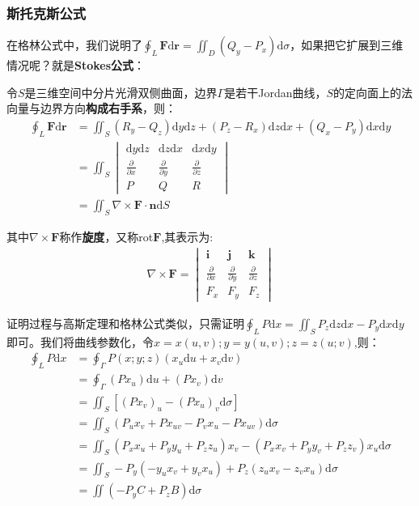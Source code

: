 \documentclass{ctexart}
\let\oldtextbf\textbf
\renewcommand{\textbf}[1]{\textcolor{brown!50!red}{\oldtextbf{#1}}}
\begin{document}
\subsubsection{斯托克斯公式}
在格林公式中，我们说明了$\oint_L \bm{F}\mathrm{d}\bm{r}=\iint_D(Q_y-P_x)\mathrm{d}\sigma$，如果把它扩展到三维情况呢？就是\textbf{\color{brown!50!red}Stokes公式}：
\begin{tcolorbox}[
    colback=bac1,     %
    colframe=fra1,   %
    coltitle=white,             %
    coltext=tex1,
    title=Stokes公式,
    fonttitle=\bfseries,        %
arc=3mm,                     %
breakable
]
令$S$是三维空间中分片光滑双侧曲面，边界$\Gamma$是若干Jordan曲线，$S$的定向面上的法向量与边界方向\textbf{\color{brown!50!red}构成右手系}，则：
\begin{align*} 
 \oint_L\bm{F}\mathrm{d}\bm{r}&=\iint_S(R_y-Q_z)\mathrm{d}y\mathrm{d}z+(P_z-R_x)\mathrm{d}z\mathrm
{d}x+(Q_x-P_y)\mathrm{d}x\mathrm{d}y \\
&=\iint_S\begin{vmatrix}
\mathrm{d}y\mathrm{d}z  & \mathrm{d}z\mathrm{d}x& \mathrm{d}x\mathrm{d}y\\
\frac{\partial}{\partial x}  & \frac{\partial}{\partial y} & \frac{\partial}{\partial z}\\
P  & Q & R
\end{vmatrix} \\ 
&=\iint_S \nabla\times\bm{F}\cdot \bm{n}\mathrm{d}S\tag{3-10}       
\end{align*}

其中$\nabla\times\bm{F}$称作\textbf{\color{brown!50!red}旋度}，又称rot$\bm{F}$,其表示为:
\begin{align*} 
 \nabla \times \mathbf{F} = \begin{vmatrix}
\mathbf{i} & \mathbf{j} & \mathbf{k} \\
\frac{\partial}{\partial x} & \frac{\partial}{\partial y} & \frac{\partial}{\partial z} \\
F_x & F_y & F_z
\end{vmatrix} \tag{3-11}       
\end{align*}
\end{tcolorbox}

证明过程与高斯定理和格林公式类似，只需证明$\oint_LP\mathrm{d}x=\iint_S P_z\mathrm{d}z\mathrm{d}x-P_y\mathrm{d}x\mathrm{d}y$即可。我们将曲线参数化，令$x=x(u,v);y=y(u,v);z=z(u;v)$,则：
\begin{align*} 
 \oint_LP\mathrm{d}x&=\oint _\Gamma P(x;y;z)(x_u\mathrm{d}u+x_v\mathrm{d}v)\\
&=\oint_\Gamma (Px_u)\mathrm{d}u+(Px_v)\mathrm{d}v\\
&=\iint_S[(Px_v)_u-(Px_u)_v\mathrm{d}\sigma] \\
&=\iint_S(P_ux_v+Px_{uv}-P_vx_u-Px_{uv})\mathrm{d}\sigma   \\
&=\iint_S(P_xx_u+P_yy_u+P_zz_u)x_v-(P_xx_v+P_yy_v+P_zz_v)x_u\mathrm{d}\sigma\\ 
&=\iint_S-P_y(-y_ux_v+y_vx_u)+P_z(z_ux_v-z_vx_u)\mathrm{d}\sigma \\
&=\iint(-P_yC+P_zB)\mathrm{d}\sigma     
\end{align*}
\end{document}
